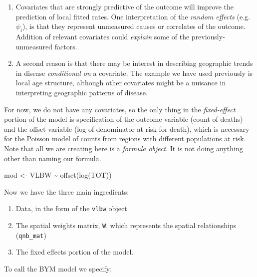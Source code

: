 \documentclass[
]{book}
\newenvironment{Shaded}{\begin{snugshade}}{\end{snugshade}}
\newcommand{\FunctionTok}[1]{\textcolor[rgb]{0.00,0.00,0.00}{#1}}
\newcommand{\NormalTok}[1]{#1}
\newcommand{\OtherTok}[1]{\textcolor[rgb]{0.56,0.35,0.01}{#1}}
\newcommand{\SpecialCharTok}[1]{\textcolor[rgb]{0.00,0.00,0.00}{#1}}
\providecommand{\tightlist}{%
  \setlength{\itemsep}{0pt}\setlength{\parskip}{0pt}}
\begin{document}
\begin{enumerate}
\def\labelenumi{\arabic{enumi}.}
\tightlist
\item
  Covariates that are strongly predictive of the outcome will improve the prediction of local fitted rates. One interpretation of the \emph{random effects} (e.g.~\(\psi_i\)), is that they represent unmeasured causes or correlates of the outcome. Addition of relevant covariates could \emph{explain} some of the previously-unmeasured factors.
\item
  A second reason is that there may be interest in describing geographic trends in disease \emph{conditional on} a covariate. The example we have used previously is local age structure, although other covariates might be a nuisance in interpreting geographic patterns of disease.
\end{enumerate}

For now, we do not have any covariates, so the only thing in the \emph{fixed-effect} portion of the model is specification of the outcome variable (count of deaths) and the offset variable (log of denominator at risk for death), which is necessary for the Poisson model of counts from regions with different populations at risk. Note that all we are creating here is a \emph{formula object}. It is not doing anything other than naming our formula.

\begin{Shaded}
\begin{Highlighting}[]
\NormalTok{mod }\OtherTok{\textless{}{-}}\NormalTok{ VLBW }\SpecialCharTok{\textasciitilde{}} \FunctionTok{offset}\NormalTok{(}\FunctionTok{log}\NormalTok{(TOT))}
\end{Highlighting}
\end{Shaded}

Now we have the three main ingredients:

\begin{enumerate}
\def\labelenumi{\arabic{enumi}.}
\tightlist
\item
  Data, in the form of the \texttt{vlbw} object
\item
  The spatial weights matrix, \texttt{W}, which represents the spatial relationships (\texttt{qnb\_mat})
\item
  The fixed effects portion of the model.
\end{enumerate}

To call the BYM model we specify:
\end{document}
